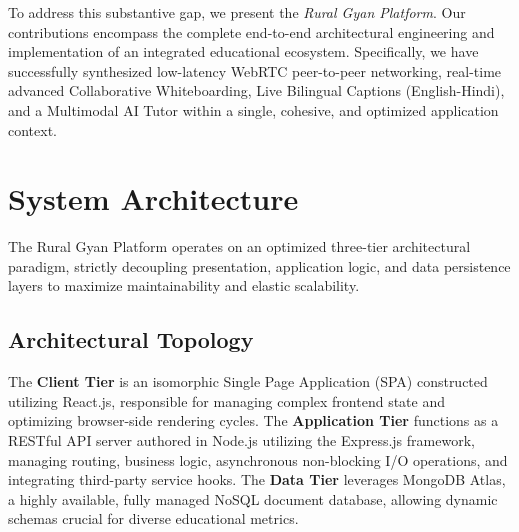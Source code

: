 \documentclass[12pt, journal, onecolumn]{IEEEtran}
\begin{document}
To address this substantive gap, we present the \textit{Rural Gyan Platform}. Our contributions encompass the complete end-to-end architectural engineering and implementation of an integrated educational ecosystem. Specifically, we have successfully synthesized low-latency WebRTC peer-to-peer networking, real-time advanced Collaborative Whiteboarding, Live Bilingual Captions (English-Hindi), and a Multimodal AI Tutor within a single, cohesive, and optimized application context.

\section{System Architecture}
The Rural Gyan Platform operates on an optimized three-tier architectural paradigm, strictly decoupling presentation, application logic, and data persistence layers to maximize maintainability and elastic scalability.

\subsection{Architectural Topology}
The \textbf{Client Tier} is an isomorphic Single Page Application (SPA) constructed utilizing React.js, responsible for managing complex frontend state and optimizing browser-side rendering cycles. The \textbf{Application Tier} functions as a RESTful API server authored in Node.js utilizing the Express.js framework, managing routing, business logic, asynchronous non-blocking I/O operations, and integrating third-party service hooks. The \textbf{Data Tier} leverages MongoDB Atlas, a highly available, fully managed NoSQL document database, allowing dynamic schemas crucial for diverse educational metrics. 
\end{document}
